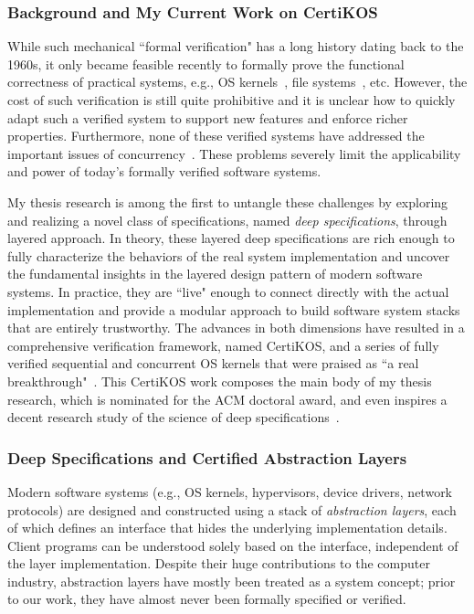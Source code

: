 \documentclass[a4paper, 10pt]{article}
\begin{document}
\begin{small}
\subsubsection*{\large Background and My Current Work on CertiKOS}

While such mechanical ``formal verification" has a long history dating back to the 1960s,  it only became feasible recently to formally prove the functional correctness of practical systems, e.g., OS kernels~\cite{sel4}, file systems~\cite{fscq}, etc. However, the cost of such verification is still quite prohibitive and it is unclear how to quickly adapt such a verified system to support new features and enforce richer properties. Furthermore, none of these verified systems have addressed the important
issues of concurrency~\cite{apsys}. These problems severely limit
the applicability and power of today’s formally verified
software systems.

My thesis research is among the first to untangle these challenges by exploring and realizing a novel class of specifications, named 
\emph{deep specifications}, through layered approach. 
In theory, these layered deep specifications are rich
enough to fully characterize the behaviors of the real system implementation
and
uncover the fundamental
insights in the  layered design pattern of modern software systems. In practice, they are ``live" enough to  connect directly  with the actual  implementation and provide a modular approach to build
 software system stacks that are entirely trustworthy.
The advances in both dimensions have resulted in a comprehensive
verification framework, named CertiKOS, and
a series of fully verified sequential and concurrent OS kernels that were praised as ``a real breakthrough"~\cite{news}.
This CertiKOS work composes the main body of my thesis research, which is nominated for the ACM doctoral award,
and even inspires a decent research study of the science of deep specifications~\cite{deepspec}.


\subsubsection*{\small Deep Specifications and Certified Abstraction Layers}
Modern software systems (e.g., OS kernels, hypervisors, device drivers, network protocols) are designed and constructed using a
stack of \emph{abstraction layers},
each of which defines an interface that hides the underlying implementation
details. Client programs can be understood solely based on the interface,
independent of the layer implementation. Despite their huge contributions
to the computer industry,
abstraction layers have mostly been treated as a system
concept; prior to our work, they have almost never been formally specified or verified.


\end{small}
\end{document}
